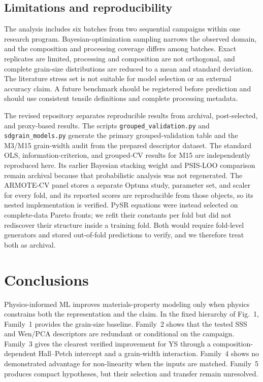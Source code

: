 \documentclass[5p,times,twocolumn]{elsarticle}
\begin{document}
\subsection{Limitations and reproducibility}

The analysis includes six batches from two sequential campaigns within one research program. Bayesian-optimization sampling narrows the observed domain, and the composition and processing coverage differs among batches. Exact replicates are limited, processing and composition are not orthogonal, and complete grain-size distributions are reduced to a mean and standard deviation. The literature stress set is not suitable for model selection or an external accuracy claim. A future benchmark should be registered before prediction and should use consistent tensile definitions and complete processing metadata.

The revised repository separates reproducible results from archival, post-selected, and proxy-based results. The scripts \texttt{grouped\_validation.py} and \texttt{sdgrain\_models.py} generate the primary grouped-validation table and the M3/M15 grain-width audit from the prepared descriptor dataset. The standard OLS, information-criterion, and grouped-CV results for M15 are independently reproduced here. Its earlier Bayesian stacking weight and PSIS-LOO comparison remain archival because that probabilistic analysis was not regenerated. %
The ARMOTE-CV panel stores a separate Optuna study, parameter set, and scaler for every fold, and its reported scores are reproducible from those objects, so its nested implementation is verified. PySR equations were instead selected on complete-data Pareto fronts; we refit their constants per fold but did not rediscover their structure inside a training fold. Both would require fold-level generators and stored out-of-fold predictions to verify, and we therefore treat both as archival.

\section{Conclusions}
\label{sec:conclusions}

Physics-informed ML improves materials-property modeling only when physics constrains both the representation and the claim. In the fixed hierarchy of Fig.~1, Family~1 provides the grain-size baseline. Family~2 shows that the tested SSS and Wen/PCA descriptors are redundant or conditional on the campaign. Family~3 gives the clearest verified improvement for YS through a composition-dependent Hall--Petch intercept and a grain-width interaction. Family~4 shows no demonstrated advantage for non-linearity when the inputs are matched. Family~5 produces compact hypotheses, but their selection and transfer remain unresolved.
\end{document}
